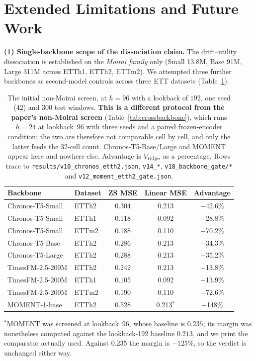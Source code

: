 \section{Extended Limitations and Future Work}
\label{app:limitations}

\textbf{(1) Single-backbone scope of the dissociation claim.}
The drift--utility dissociation is established on the \emph{Moirai
family} only (Small 13.8M, Base 91M, Large 311M across ETTh1, ETTh2,
ETTm2).  We attempted three further backbones as second-model
controls across three ETT datasets (Table~\ref{tab:backbone_screen}).

\begin{table}[ht]
\centering\small
\caption{The initial non-Moirai screen, at $h{=}96$ with a lookback of $192$, one
seed (42) and $300$ test windows. \textbf{This is a different protocol from the
paper's non-Moirai screen} (Table~\ref{tab:crossbackbone}), which runs $h{=}24$
at lookback~$96$ with three seeds and a paired frozen-encoder condition; the two
are therefore not comparable cell by cell, and only the latter feeds the 32-cell
count. Chronos-T5-Base/Large and MOMENT appear here and nowhere else. Advantage
is $V_{\text{ridge}}$ as a percentage. Rows trace to
\texttt{results/v10\_chronos\_etth2.json}, \texttt{v14\_*}, \texttt{v18\_backbone\_gate/*}
and \texttt{v12\_moment\_etth2\_gate.json}.}
\label{tab:backbone_screen}
\begin{tabular}{llccc}
\toprule
Backbone & Dataset & ZS MSE & Linear MSE & Advantage \\
\midrule
Chronos-T5-Small  & ETTh2 & 0.304 & 0.213 & $-$42.6\% \\
Chronos-T5-Small  & ETTh1 & 0.118 & 0.092 & $-$28.8\% \\
Chronos-T5-Small  & ETTm2 & 0.188 & 0.110 & $-$70.2\% \\
Chronos-T5-Base   & ETTh2 & 0.286 & 0.213 & $-$34.3\% \\
Chronos-T5-Large  & ETTh2 & 0.288 & 0.213 & $-$35.2\% \\
TimesFM-2.5-200M  & ETTh2 & 0.242 & 0.213 & $-$13.8\% \\
TimesFM-2.5-200M  & ETTh1 & 0.105 & 0.092 & $-$13.9\% \\
TimesFM-2.5-200M  & ETTm2 & 0.190 & 0.110 & $-$72.6\% \\
MOMENT-1-base     & ETTh2 & 0.528 & 0.213$^{*}$ & $-$148\%  \\
\bottomrule
\end{tabular}

\vspace{2pt}
{\footnotesize $^{*}$MOMENT was screened at lookback~$96$, whose baseline is
$0.235$; its margin was nonetheless computed against the lookback-192 baseline
$0.213$, and we print the comparator actually used. Against $0.235$ the margin is
$-125\%$, so the verdict is unchanged either way.}
\end{table}

